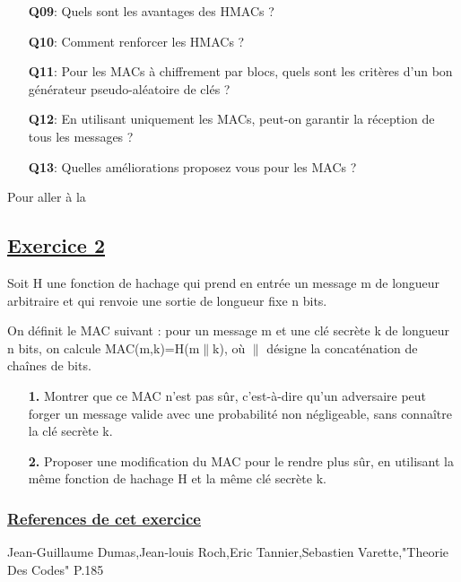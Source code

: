 \begin{enumerate}
    \item [\textbf{Q09}:] Quels sont les avantages des HMACs ?
    
    \item [\textbf{Q10}:] Comment renforcer les HMACs ?
    
    \item [\textbf{Q11}:] Pour les MACs à chiffrement par blocs, quels sont les critères d'un bon générateur pseudo-aléatoire de clés ?
    
    \item [\textbf{Q12}:] En utilisant uniquement les MACs, peut-on garantir la réception de tous les messages ?
    
    \item [\textbf{Q13}:] Quelles améliorations proposez vous pour les MACs ?\\
\end{enumerate}

\par Pour aller à la 


\subsection{\textbf{\underline{Exercice 2}}}
\label{Exo 2}

Soit H une fonction de hachage qui prend en entrée un message m de longueur arbitraire et qui renvoie une sortie de longueur fixe n bits.

On définit le MAC suivant : pour un message m et une clé secrète k de longueur n bits, on calcule MAC(m,k)=H(m$\parallel$k), où $\parallel$ désigne la concaténation de chaînes de bits.
\begin{enumerate}
    \item [\textbf{1.}] Montrer que ce MAC n’est pas sûr, c’est-à-dire qu’un adversaire peut forger un message valide avec une probabilité non négligeable, sans connaître la clé secrète k.
    \item [\textbf{2.}] Proposer une modification du MAC pour le rendre plus sûr, en utilisant la même fonction de hachage H et la même clé secrète k.
\end{enumerate}

\subsubsection{\textbf{\underline{References de cet exercice}}}
Jean-Guillaume Dumas,Jean-louis Roch,Eric Tannier,Sebastien Varette,"Theorie Des Codes" P.185\\

